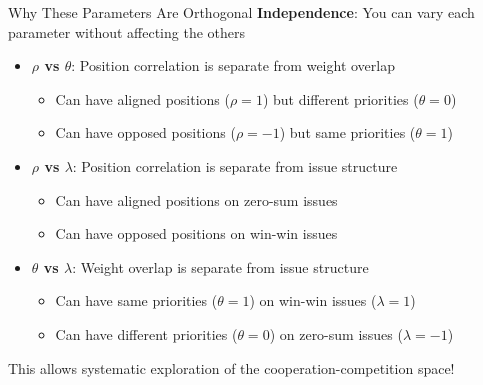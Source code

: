 \documentclass{beamer}
\begin{document}
\begin{frame}{Why These Parameters Are Orthogonal}
\textbf{Independence}: You can vary each parameter without affecting the others

\vspace{0.5cm}

\begin{itemize}
    \item \textbf{$\rho$ vs $\theta$}: Position correlation is separate from weight overlap
    \begin{itemize}
        \item Can have aligned positions ($\rho=1$) but different priorities ($\theta=0$)
        \item Can have opposed positions ($\rho=-1$) but same priorities ($\theta=1$)
    \end{itemize}
    
    \vspace{0.3cm}
    
    \item \textbf{$\rho$ vs $\lambda$}: Position correlation is separate from issue structure
    \begin{itemize}
        \item Can have aligned positions on zero-sum issues
        \item Can have opposed positions on win-win issues
    \end{itemize}
    
    \vspace{0.3cm}
    
    \item \textbf{$\theta$ vs $\lambda$}: Weight overlap is separate from issue structure
    \begin{itemize}
        \item Can have same priorities ($\theta=1$) on win-win issues ($\lambda=1$)
        \item Can have different priorities ($\theta=0$) on zero-sum issues ($\lambda=-1$)
    \end{itemize}
\end{itemize}

\vspace{0.3cm}

This allows systematic exploration of the cooperation-competition space!
\end{frame}
\end{document}
